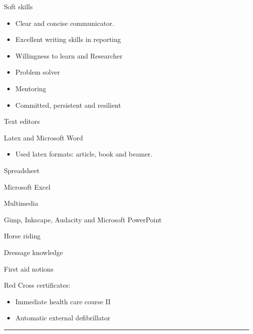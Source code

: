 \documentclass[a4paper,10pt]{article}
\newlength{\cvcolumngapwidth}
\newlength{\cvleftcolumnwidth}
\newlength{\cvrightcolumnwidth}
\newcommand{\cvsectionstyle}[1]{{\normalsize\cvsectionfont\textcolor{cvsectioncolor}{#1}}}
\newcommand{\cvheadingstyle}[1]{{\normalsize\cvheadingfont\textcolor{cvheadingcolor}{#1}}}
\newlength{\cvafteritemskipamount}
\newlength{\cvaftersectionskipamount}
\newlength{\cvbetweensectionandheadingextraskipamount}
\newlength{\cvparskip}
\newcommand{\cvsection}[1]{
    \begin{minipage}[t]{\cvleftcolumnwidth}
        \raggedleft\cvsectionstyle{#1}
    \end{minipage}%
    \hspace{\cvcolumngapwidth}%
    \begin{minipage}[t]{\cvrightcolumnwidth}
        \textcolor{cvrulecolor}{\rule{\cvrightcolumnwidth}{0.3mm}}
    \end{minipage}

    \vspace{\cvaftersectionskipamount}
}
\newcommand{\cvitem}[2]{
    \begin{minipage}[t]{\cvleftcolumnwidth}
        \raggedleft #1
    \end{minipage}%
    \hspace{\cvcolumngapwidth}%
    \begin{minipage}[t]{\cvrightcolumnwidth}
        \setlength{\parskip}{\cvparskip} #2
    \end{minipage}

    \vspace{\cvafteritemskipamount}
}
\begin{document}
\cvitem{
    \cvheadingstyle{Soft skills}
}{
    \begin{itemize}
    	\item Clear and concise communicator.
    	\item Excellent writing skills in reporting
    	\item Willingness to learn and Researcher
    	\item Problem solver
    	\item Mentoring
    	\item Committed, persistent and resilient
    \end{itemize}
}

\cvitem{
    \cvheadingstyle{Text editors}
}{
    Latex and Microsoft Word
    \begin{itemize}
        \item Used latex formats: article, book and beamer.
    \end{itemize}
}

\cvitem{
    \cvheadingstyle{Spreadsheet}
}{
    Microsoft Excel
}

\cvitem{
    \cvheadingstyle{Multimedia}
}{
    Gimp, Inkscape, Audacity and Microsoft PowerPoint
}




\cvitem{
    \cvheadingstyle{Horse riding}
}{
    Dressage knowledge
}

\cvitem{
    \cvheadingstyle{First aid notions}
}{
    Red Cross certificates:
    \begin{itemize}
        \item Immediate health care course II
        \item Automatic external defibrillator
    \end{itemize}
}


\cvsection{ADDITIONAL INFORMATION}

\vspace{\cvbetweensectionandheadingextraskipamount}
\end{document}
